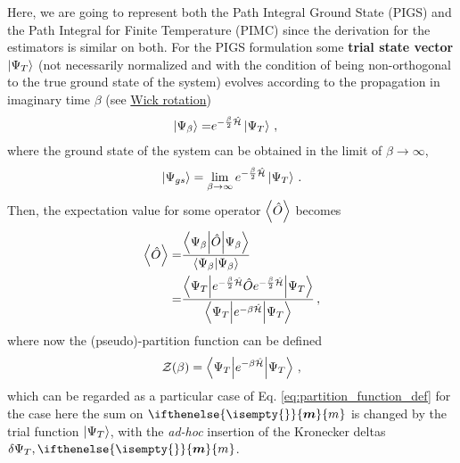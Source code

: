 \documentclass[a4paper,11pt]{article}
\newcommand{\oper}[1]{\hat{#1}}
\newcommand{\1}{{\oper{I}}}
\renewcommand{\H}{\oper{\mathcal{H}}}
\newcommand{\Z}{\mathcal{Z}}
\newcommand{\m}[2]{%
	\ifthenelse{\isempty{#1}}%
	{\vb*{m}^{\hspace{-0.2mm}{#2}}}%
	{m_{\hspace{-0.1mm}\scriptscriptstyle{#1}}^{\hspace{-0.2mm}\scriptscriptstyle{#2}}}%
}
\newcommand{\+}{\uparrow}
\renewcommand{\-}{\downarrow}
\newcommand{\0}{0}
\begin{document}
	Here, we are going to represent both the Path Integral Ground State (PIGS) and the Path Integral for Finite Temperature (PIMC) since the derivation for the estimators is similar on both. For the PIGS formulation some \textbf{trial state vector} $\ket{\Psi_T}$ (not necessarily normalized and with the condition of being non-orthogonal to the true ground state of the system) evolves according to the propagation in imaginary time $\beta$ \cite{Yan_2017} (see \href{https://en.wikipedia.org/wiki/Wick_rotation}{Wick rotation})
	\begin{align}
		\ket{\Psi_{\beta}} =& e^{-\frac{\beta}{2} \H} \ket{\Psi_T} \, ,
	\end{align}
	where the ground state of the system can be obtained in the limit of $\beta \rightarrow \infty$,
	\begin{align}
		\label{eq:ground_state_PIGS}
		\ket{\Psi_{gs}} = \lim_{\beta \rightarrow \infty} e^{-\frac{\beta}{2} \H} \ket{\Psi_T} \,.
	\end{align}
	Then, the expectation value for some operator $\expval{\oper{O}}$ becomes
	\begin{align}
		\label{eq:expectation_PIGS}
		\expval{\oper{O}} =& \frac{\mel**{\Psi_{\beta}}{\oper{O}}{\Psi_{\beta}}}{\braket{\Psi_{\beta}}} \nonumber \\
		=& \frac{ \mel**{\Psi_T}{e^{-\frac{\beta}{2} \H} \oper{O}e^{- \frac{\beta}{2} \H }}{\Psi_T}}{\mel**{\Psi_T}{e^{-\beta \H}}{\Psi_T}}
		 \, ,
	\end{align}
	where now the (pseudo)-partition function can be defined
	\begin{align}
		\label{eq:pseudo_partition_function}
		\Z(\beta) = \mel**{\Psi_T}{e^{-\beta \H}}{\Psi_T} \,, 
	\end{align}
	which can be regarded as a particular case of Eq. \eqref{eq:partition_function_def} for the case here the sum on $\m{}{}$ is changed by the trial function $\ket{\Psi_T}$, with the \textit{ad-hoc} insertion of the Kronecker deltas $\delta{\Psi_T,\m{}{}}$.
	
\end{document}
